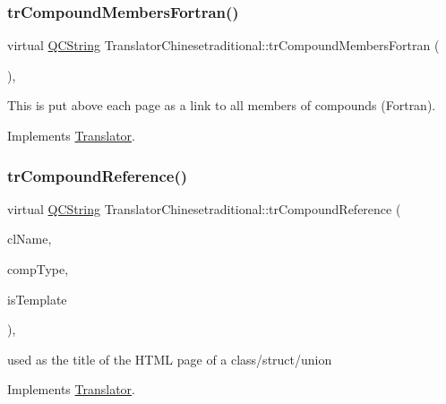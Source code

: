 \subsubsection{\texorpdfstring{trCompoundMembersFortran()}{trCompoundMembersFortran()}}
{\footnotesize\ttfamily virtual \mbox{\hyperlink{class_q_c_string}{Q\+C\+String}} Translator\+Chinesetraditional\+::tr\+Compound\+Members\+Fortran (\begin{DoxyParamCaption}{ }\end{DoxyParamCaption})\hspace{0.3cm}{\ttfamily [inline]}, {\ttfamily [virtual]}}

This is put above each page as a link to all members of compounds (Fortran). 

Implements \mbox{\hyperlink{class_translator}{Translator}}.

\mbox{\label{class_translator_chinesetraditional_abc223ad4429cb08482f3b5a259b59f95}} 
\subsubsection{\texorpdfstring{trCompoundReference()}{trCompoundReference()}}
{\footnotesize\ttfamily virtual \mbox{\hyperlink{class_q_c_string}{Q\+C\+String}} Translator\+Chinesetraditional\+::tr\+Compound\+Reference (\begin{DoxyParamCaption}\item[{const char $\ast$}]{cl\+Name,  }\item[{\mbox{\hyperlink{class_class_def_ae70cf86d35fe954a94c566fbcfc87939}{Class\+Def\+::\+Compound\+Type}}}]{comp\+Type,  }\item[{bool}]{is\+Template }\end{DoxyParamCaption})\hspace{0.3cm}{\ttfamily [inline]}, {\ttfamily [virtual]}}

used as the title of the H\+T\+ML page of a class/struct/union 

Implements \mbox{\hyperlink{class_translator}{Translator}}.

\mbox{\label{class_translator_chinesetraditional_a7a1b3c9186c8afb16d7538fbd7f66f0b}} 
